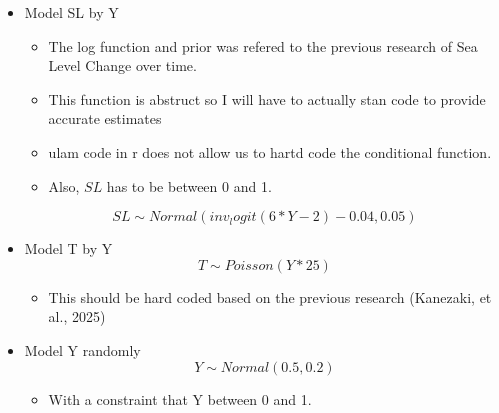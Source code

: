 \documentclass{article}
\begin{document}
\begin{itemize}
$$\alpha_S, \beta _{S_Y}, \beta _{S_{dS}} \sim Normal(0,0.1)$$
$$\beta _{S_T} = \overline{\beta _{S_T}} + \sigma_{\beta _{S_T}} * z_{\beta_{S_T}}[T]$$
$$\overline{\beta _{S_T}} \sim Normal(0, 0.1)$$
$$\sigma_{\beta _{S_T}} \sim Exponential(1)$$
$$z_{\beta _{S_T}}[T] \sim Normal(0, 0.1)$$



\item Model SL by Y 
\begin{itemize}
    \item The log function and prior was refered to the previous research of Sea Level Change over time. 
    \item This function is abstruct so I will have to actually stan code to provide accurate estimates
    \item ulam code in r does not allow us to hartd code the conditional function. 
    \item Also, $SL$ has to be between 0 and 1. 
\end{itemize}
$$SL \sim Normal(inv_logit(6 * Y - 2) - 0.04, 0.05)$$

\item Model T by Y  
$$T \sim Poisson(Y * 25)$$
\begin{itemize}
    \item This should be hard coded based on the previous research (Kanezaki, et al., 2025)
\end{itemize}

\item Model Y randomly
$$Y \sim Normal(0.5, 0.2)$$
\begin{itemize}
    \item With a constraint that Y between 0 and 1. 
\end{itemize}

\end{itemize}


\newpage
\end{document}
